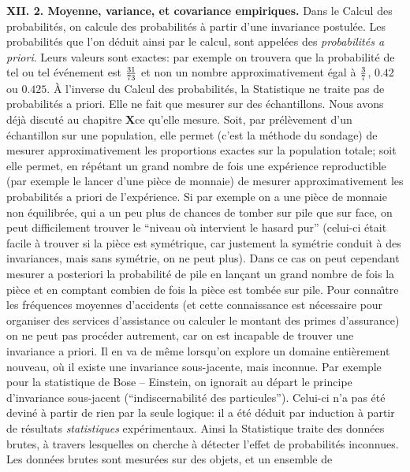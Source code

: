 {\bf XII. 2. Moyenne, variance, et covariance empiriques.}
\medskip 
Dans le Calcul des probabilit\'es, on calcule des probabilit\'es \`a
partir d'une invariance postul\'ee. Les probabilit\'es que l'on d\'eduit 
ainsi par le calcul, sont appel\'ees des {\it probabilit\'es a priori}. 
Leurs valeurs sont exactes: par exemple on trouvera que la probabilit\'e 
de tel ou tel \'ev\'enement est $31 \over 73$ et non un nombre 
approximativement \'egal \`a $3 \over 7$, $0.42$ ou $0.425$. 
\medskip 
\`A l'inverse du Calcul des probabilit\'es, la Statistique ne traite pas
de probabilit\'es a priori. Elle ne fait que mesurer sur des 
\'echantillons. Nous avons d\'ej\`a discut\'e au chapitre {\bf X}\a ce 
qu'elle mesure.  Soit, par pr\'el\`evement d'un \'echantillon sur une 
population, elle permet (c'est la m\'ethode du sondage) de mesurer 
approximativement les proportions exactes sur la population totale; 
soit elle permet, en r\'ep\'etant un grand nombre de fois une 
exp\'erience reproductible (par exemple le lancer d'une pi\`ece de 
monnaie) de mesurer approximativement les probabilit\'es a priori de 
l'exp\'erience. Si par exemple on a une pi\`ece de monnaie non 
\'equilibr\'ee, qui a un peu plus de chances de tomber sur pile que sur 
face, on peut difficilement trouver le ``niveau o\`u intervient le hasard 
pur'' (celui-ci \'etait facile \`a trouver si la pi\`ece est sym\'etrique, 
car justement la sym\'etrie conduit \`a des invariances,  mais sans 
sym\'etrie, on ne peut plus).  Dans ce cas on peut cependant mesurer a 
posteriori la probabilit\'e de pile en lan\c{c}ant un grand nombre de 
fois la pi\`ece et en comptant combien de fois la pi\`ece est tomb\'ee 
sur pile. Pour conna{\^\i}tre les fr\'equences moyennes d'accidents
(et cette connaissance est n\'ecessaire pour organiser des services 
d'assistance ou calculer le montant des primes d'assurance) 
on ne peut pas proc\'eder autrement, car on est incapable de trouver 
une invariance a priori. Il en va de m\^eme lorsqu'on explore un 
domaine enti\`erement nouveau, o\`u il existe une invariance 
sous-jacente, mais inconnue. Par exemple pour la statistique de
Bose -- Einstein, on ignorait au d\'epart le principe d'invariance 
sous-jacent (``indiscernabilit\'e des particules''). Celui-ci n'a pas 
\'et\'e devin\'e \`a partir de rien par la seule logique: il a \'et\'e 
d\'eduit par induction \`a partir de r\'esultats {\it statistiques} 
exp\'erimentaux. 
\medskip 
Ainsi la Statistique traite des donn\'ees brutes, \`a travers lesquelles
on cherche \`a d\'etecter l'effet de probabilit\'es inconnues. Les
donn\'ees brutes sont mesur\'ees sur des objets, et un ensemble de 
